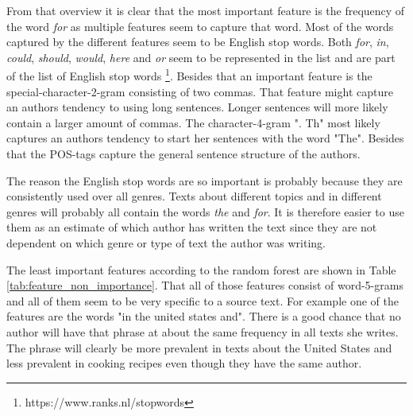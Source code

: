 From that overview it is clear that the most important feature is the frequency
of the word \textit{for} as multiple features seem to capture that word. Most
of the words captured by the different features seem to be English stop words.
Both \textit{for}, \textit{in}, \textit{could}, \textit{should}, \textit{would},
\textit{here} and \textit{or} seem to be represented in the list and are part
of the list of English stop words \footnote{https://www.ranks.nl/stopwords}.
Besides that an important feature is the special-character-2-gram consisting
of two commas. That feature might capture an authors tendency to using long
sentences. Longer sentences will more likely contain a larger amount of commas.
The character-4-gram ". Th" most likely captures an authors tendency to start
her sentences with the word "The". Besides that the \gls{POS}-tags capture the
general sentence structure of the authors.

The reason the English stop words are so important is probably because they are
consistently used over all genres. Texts about different topics and in different
genres will probably all contain the words \textit{the} and \textit{for}. It
is therefore easier to use them as an estimate of which author has written the
text since they are not dependent on which genre or type of text the author was
writing.

The least important features according to the random forest are shown in
Table \ref{tab:feature_non_importance}. That all of those features consist of
word-5-grams and all of them seem to be very specific to a source text. For
example one of the features are the words "in the united states and". There is a
good chance that no author will have that phrase at about the same frequency in
all texts she writes. The phrase will clearly be more prevalent in texts about
the United States and less prevalent in cooking recipes even though they have
the same author.

